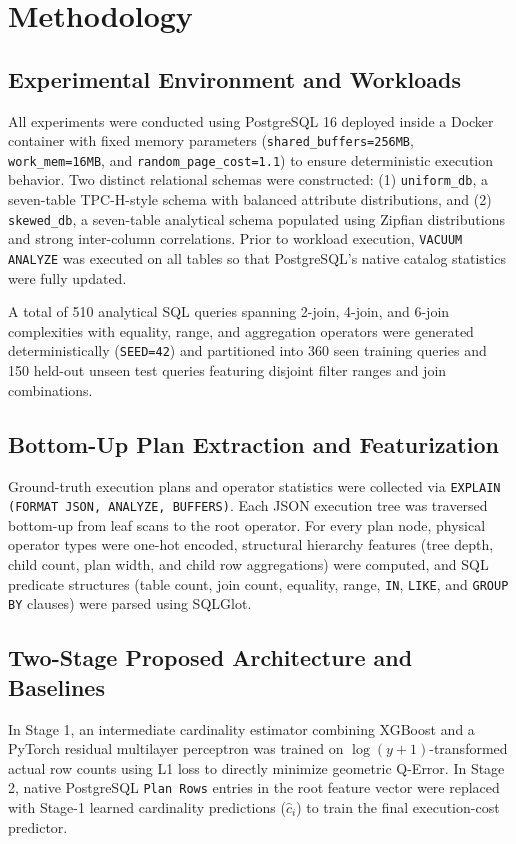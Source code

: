 \documentclass[conference]{IEEEtran}
\begin{document}
\section{Methodology}
\subsection{Experimental Environment and Workloads}
All experiments were conducted using PostgreSQL 16 deployed inside a Docker container with fixed memory parameters (\texttt{shared\_buffers=256MB}, \texttt{work\_mem=16MB}, and \texttt{random\_page\_cost=1.1}) to ensure deterministic execution behavior. Two distinct relational schemas were constructed: (1) \texttt{uniform\_db}, a seven-table TPC-H-style schema with balanced attribute distributions, and (2) \texttt{skewed\_db}, a seven-table analytical schema populated using Zipfian distributions and strong inter-column correlations. Prior to workload execution, \texttt{VACUUM ANALYZE} was executed on all tables so that PostgreSQL's native catalog statistics were fully updated.

A total of 510 analytical SQL queries spanning 2-join, 4-join, and 6-join complexities with equality, range, and aggregation operators were generated deterministically (\texttt{SEED=42}) and partitioned into 360 seen training queries and 150 held-out unseen test queries featuring disjoint filter ranges and join combinations.

\subsection{Bottom-Up Plan Extraction and Featurization}
Ground-truth execution plans and operator statistics were collected via \texttt{EXPLAIN (FORMAT JSON, ANALYZE, BUFFERS)}. Each JSON execution tree was traversed bottom-up from leaf scans to the root operator. For every plan node, physical operator types were one-hot encoded, structural hierarchy features (tree depth, child count, plan width, and child row aggregations) were computed, and SQL predicate structures (table count, join count, equality, range, \texttt{IN}, \texttt{LIKE}, and \texttt{GROUP BY} clauses) were parsed using SQLGlot.

\subsection{Two-Stage Proposed Architecture and Baselines}
In Stage 1, an intermediate cardinality estimator combining XGBoost \cite{b3} and a PyTorch residual multilayer perceptron was trained on $\log(y + 1)$-transformed actual row counts using L1 loss to directly minimize geometric Q-Error. In Stage 2, native PostgreSQL \texttt{Plan Rows} entries in the root feature vector were replaced with Stage-1 learned cardinality predictions ($\hat{c}_i$) to train the final execution-cost predictor.
\end{document}
